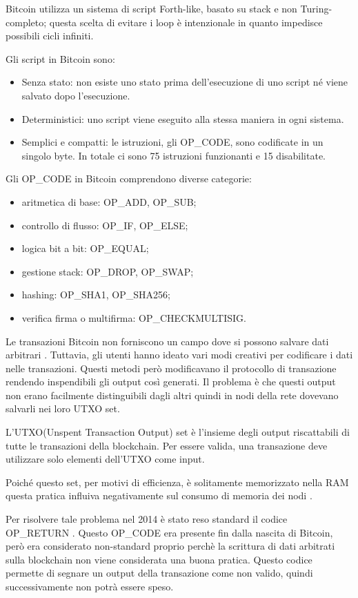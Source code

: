 Bitcoin utilizza un sistema di script Forth-like, basato su stack e non Turing-completo; questa scelta di evitare i loop è intenzionale in quanto impedisce possibili cicli infiniti. 

Gli script \cite{opcode} in Bitcoin sono:
\begin{itemize}
    \item Senza stato: non esiste uno stato prima dell'esecuzione di uno script né viene salvato dopo l'esecuzione.
    \item Deterministici: uno script viene eseguito alla stessa maniera in ogni sistema.
    \item Semplici e compatti: le istruzioni, gli OP\_CODE, sono codificate in un singolo byte. In totale ci sono 75 istruzioni funzionanti e 15 disabilitate.
\end{itemize}
Gli OP\_CODE in Bitcoin comprendono diverse categorie:
\begin{itemize}
    \item aritmetica di base: OP\_ADD, OP\_SUB;
    \item controllo di flusso: OP\_IF, OP\_ELSE;
    \item logica bit a bit: OP\_EQUAL;
    \item gestione stack: OP\_DROP, OP\_SWAP;
    \item hashing: OP\_SHA1, OP\_SHA256;
    \item verifica firma o multifirma: OP\_CHECKMULTISIG.
\end{itemize}

Le transazioni Bitcoin non forniscono un campo dove si possono salvare dati arbitrari \cite{arbdata}. Tuttavia, gli utenti hanno ideato vari modi creativi per codificare i dati nelle transazioni. Questi metodi però modificavano il protocollo di transazione rendendo inspendibili gli output così generati. Il problema è che questi output non erano facilmente distinguibili dagli altri quindi in nodi della rete dovevano salvarli nei loro UTXO set.

L'UTXO(Unspent Transaction Output) set è l'insieme degli output riscattabili di tutte le transazioni della blockchain. Per essere valida, una transazione deve
utilizzare solo elementi dell'UTXO come input.

Poiché questo set, per motivi di efficienza, è solitamente memorizzato nella RAM \cite{utxo} questa pratica influiva negativamente sul consumo di memoria dei nodi \cite{stresstest}.

Per risolvere tale problema nel 2014 è stato reso standard il codice OP\_RETURN \cite{opreturnstandard} . Questo OP\_CODE era presente fin dalla nascita di Bitcoin, però era considerato non-standard proprio perchè la scrittura di dati arbitrati sulla blockchain non viene considerata una buona pratica. Questo codice permette di segnare un output della transazione come non valido, quindi successivamente non potrà essere speso.

